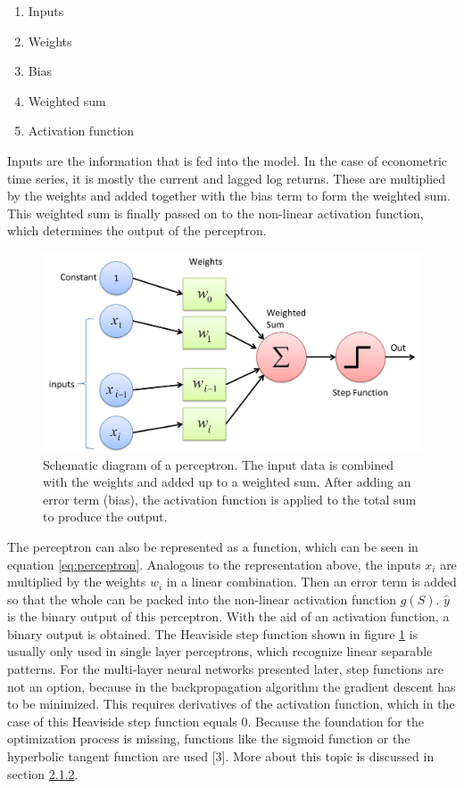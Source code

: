 \documentclass[
]{article}
\begin{document}
\begin{enumerate}
\def\labelenumi{\arabic{enumi}.}
\item
  Inputs
\item
  Weights
\item
  Bias
\item
  Weighted sum
\item
  Activation function
\end{enumerate}

Inputs are the information that is fed into the model. In the case of
econometric time series, it is mostly the current and lagged log
returns. These are multiplied by the weights and added together with the
bias term to form the weighted sum. This weighted sum is finally passed
on to the non-linear activation function, which determines the output of
the perceptron.

\newpage

\begin{figure}

{\centering \includegraphics[width=0.7\linewidth]{images/Perceptron} 

}

\caption{Schematic diagram of a perceptron. The input data is combined with the weights and added up to a weighted sum. After adding an error term (bias), the activation function is applied to the total sum to produce the output.}\label{fig:perceptron_schema}
\end{figure}

The perceptron can also be represented as a function, which can be seen
in equation \ref{eq:perceptron}. Analogous to the representation above,
the inputs \(x_{i}\) are multiplied by the weights \(w_{i}\) in a linear
combination. Then an error term is added so that the whole can be packed
into the non-linear activation function \(g(S)\). \(\hat{y}\) is the
binary output of this perceptron. With the aid of an activation
function, a binary output is obtained. The Heaviside step function shown
in figure \ref{fig:perceptron_schema} is usually only used in single
layer perceptrons, which recognize linear separable patterns. For the
multi-layer neural networks presented later, step functions are not an
option, because in the backpropagation algorithm the gradient descent
has to be minimized. This requires derivatives of the activation
function, which in the case of this Heaviside step function equals 0.
Because the foundation for the optimization process is missing,
functions like the sigmoid function or the hyperbolic tangent function
are used {[}3{]}. More about this topic is discussed in section
\protect\hyperlink{backprogation_algorithm}{2.1.2}.
\end{document}
